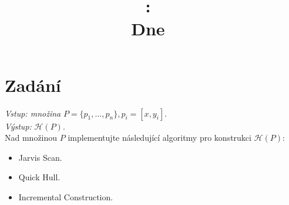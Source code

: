 \documentclass{article}
\title{
\vspace{2in}
\textmd{\textbf{\hmwkClass:\ \hmwkTitle}}\\
\normalsize\vspace{0.1in}\small{Dne\ \hmwkDueDate}\\
\vspace{0.1in}\large{\textit{\hmwkClassInstructor}}
\vspace{3in}
}
\author{\textbf{\hmwkAuthorName}}
\date{} %
\begin{document}
\maketitle


\setcounter{tocdepth}{1} %

\newpage
\tableofcontents
\newpage





\section{Zadání}
\emph{Vstup: množina} $P = \{p_1,\ldots, p_n\}, p_i = [x,y_i]$.\\

\emph{Výstup:} $\mathcal{H}(P)$.\\

Nad množinou $P$ implementujte následující algoritmy pro konstrukci $\mathcal{H}(P)$:

\begin{itemize}
\item Jarvis Scan.
\item Quick Hull.
\item Incremental Construction.\\
\end{itemize}
\end{document}
